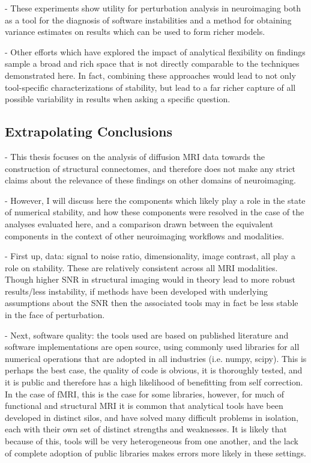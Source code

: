 - These experiments show utility for perturbation analysis in neuroimaging both as a tool for the diagnosis of
software instabilities and a method for obtaining variance estimates on results which can be used to form richer
models.

- Other efforts which have explored the impact of analytical flexibility on findings sample a broad and rich space
that is not directly comparable to the techniques demonstrated here. In fact, combining these approaches would lead
to not only tool-specific characterizations of stability, but lead to a far richer capture of all possible
variability in results when asking a specific question.

\subsection{Extrapolating Conclusions}
- This thesis focuses on the analysis of diffusion MRI data towards the construction of structural connectomes, and
therefore does not make any strict claims about the relevance of these findings on other domains of neuroimaging.

- However, I will discuss here the components which likely play a role in the state of numerical stability, and how
these components were resolved in the case of the analyses evaluated here, and a comparison drawn between the
equivalent components in the context of other neuroimaging workflows and modalities.

- First up, data: signal to noise ratio, dimensionality, image contrast, all play a role on stability. These are
relatively consistent across all MRI modalities. Though higher SNR in structural imaging would in theory lead to
more robust results/less instability, if methods have been developed with underlying assumptions about the SNR then
the associated tools may in fact be less stable in the face of perturbation.

- Next, software quality: the tools used are based on published literature and software implementations are open
source, using commonly used libraries for all numerical operations that are adopted in all industries (i.e. numpy,
scipy). This is perhaps the best case, the quality of code is obvious, it is thoroughly tested, and it is public
and therefore has a high likelihood of benefitting from self correction. In the case of fMRI, this is the case for
some libraries, however, for much of functional and structural MRI it is common that analytical tools have been
developed in distinct silos, and have solved many difficult problems in isolation, each with their own set of
distinct strengths and weaknesses. It is likely that because of this, tools will be very heterogeneous from one
another, and the lack of complete adoption of public libraries makes errors more likely in these settings.


